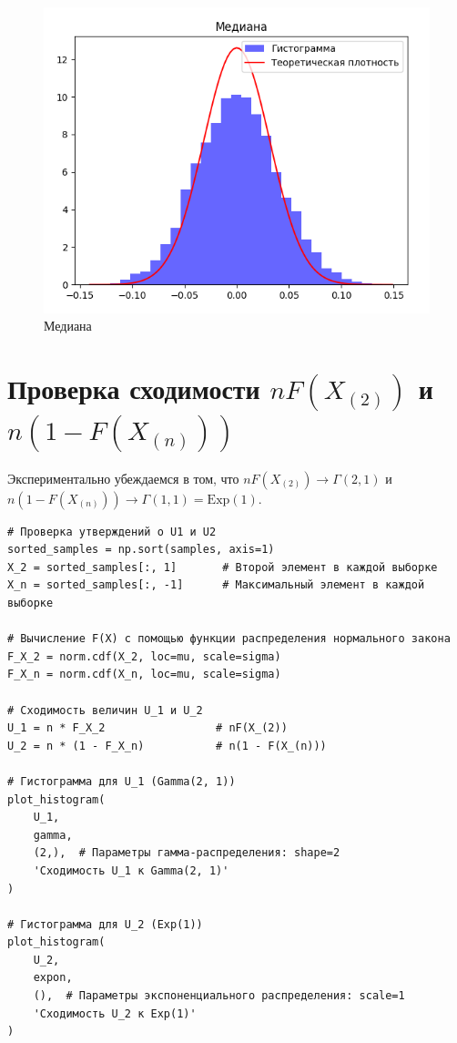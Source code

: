 \documentclass[14pt]{extreport}
\begin{document}
\begin{figure}[H]
    \centering
    \includegraphics[width=0.9\linewidth]{3.png}
    \caption{Медиана}
\end{figure}

\section{Проверка сходимости $nF(X_{(2)})$ и $n(1 - F(X_{(n)}))$}

Экспериментально убеждаемся в том, что $nF(X_{(2)}) \to \Gamma(2, 1)$ и $n(1 - F(X_{(n)})) \to \Gamma(1, 1) = \text{Exp}(1)$.

\begin{verbatim}
# Проверка утверждений о U1 и U2
sorted_samples = np.sort(samples, axis=1)
X_2 = sorted_samples[:, 1]       # Второй элемент в каждой выборке
X_n = sorted_samples[:, -1]      # Максимальный элемент в каждой выборке

# Вычисление F(X) с помощью функции распределения нормального закона
F_X_2 = norm.cdf(X_2, loc=mu, scale=sigma)
F_X_n = norm.cdf(X_n, loc=mu, scale=sigma)

# Сходимость величин U_1 и U_2
U_1 = n * F_X_2                 # nF(X_(2))
U_2 = n * (1 - F_X_n)           # n(1 - F(X_(n)))

# Гистограмма для U_1 (Gamma(2, 1))
plot_histogram(
    U_1,
    gamma,
    (2,),  # Параметры гамма-распределения: shape=2
    'Сходимость U_1 к Gamma(2, 1)'
)

# Гистограмма для U_2 (Exp(1))
plot_histogram(
    U_2,
    expon,
    (),  # Параметры экспоненциального распределения: scale=1
    'Сходимость U_2 к Exp(1)'
)
\end{verbatim}
\end{document}
